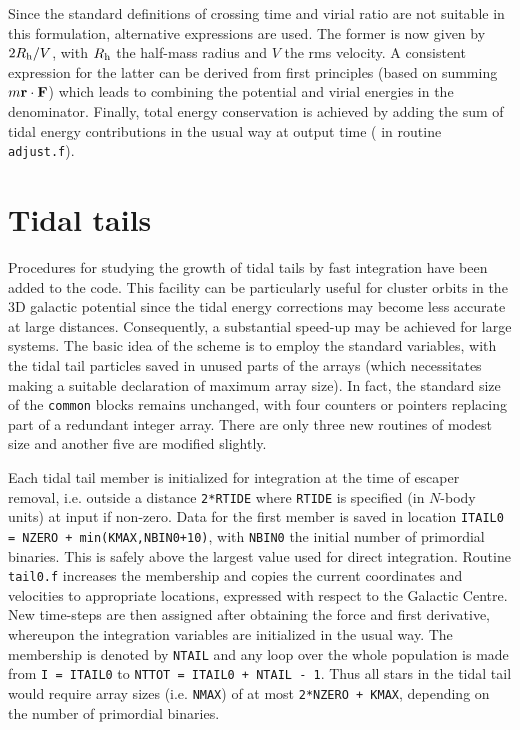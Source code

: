 \documentclass[12pt]{article}
\begin{document}
Since the standard definitions of crossing time and virial ratio are
not suitable in this formulation, alternative expressions are used.
The former is now given by $2 R_{\rm h}/V$, with $R_{\rm h}$ the
half-mass radius and $V$ the rms velocity.
A consistent expression for the latter can be derived from first principles
(based on summing $m {\bf r} \cdot {\bf F}$) which leads to combining the
potential and virial energies in the denominator.
Finally, total energy conservation is achieved by adding the sum of tidal
energy contributions in the usual way at output time ( in
routine {\tt adjust.f}).

\section{Tidal tails}

Procedures for studying the growth of tidal tails by fast integration have
been added to the code.
This facility can be particularly useful for cluster orbits in the 3D
galactic potential since the tidal energy corrections may become
less accurate at large distances.
Consequently, a substantial speed-up may be achieved for large systems.
The basic idea of the scheme is to employ the standard variables, with
the tidal tail particles saved in unused parts of the arrays (which
necessitates making a suitable declaration of maximum array size).
In fact, the standard size of the {\tt common} blocks remains unchanged,
with four counters or pointers replacing part of a redundant integer array.
There are only three new routines of modest size and another five are
modified slightly.

Each tidal tail member is initialized for integration at the time of
escaper removal, i.e. outside a distance {\tt 2*RTIDE} where {\tt RTIDE}
is specified (in $N$-body units) at input if non-zero.
Data for the first member is saved in location
{\tt ITAIL0 = NZERO + {\rm min}(KMAX,NBIN0+10)}, with {\tt NBIN0} the
initial number of primordial binaries.
This is safely above the largest value used for direct integration.
Routine {\tt tail0.f} increases the membership and copies the current
coordinates and velocities to appropriate locations, expressed with
respect to the Galactic Centre.
New time-steps are then assigned after obtaining the force and first
derivative, whereupon the integration variables are initialized in the
usual way.
The membership is denoted by {\tt NTAIL} and any loop over the whole
population is made from {\tt I = ITAIL0} to
{\tt NTTOT = ITAIL0 + NTAIL - 1}.
Thus all stars in the tidal tail would require array sizes
(i.e. {\tt NMAX}) of at most {\tt 2*NZERO + KMAX}, depending on the number
of primordial binaries.
\end{document}
